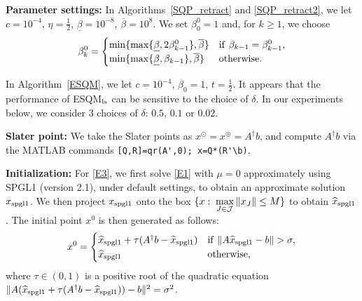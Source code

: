 \documentclass[10pt]{article}
\numberwithin{equation}{section}
\def\xfeas{x^\odot}
\def\xfeasss{x^\circledcirc}
\begin{document}
\textbf{Parameter settings:} In Algorithms~\ref{SQP_retract} and \ref{SQP_retract2}, we let $c = 10^{-4}$, $\eta = \frac{1}{2}$, $\underline{\beta} = 10^{-8}$, $\overline{\beta} = 10^8$. We set $\beta^0_0=1$ and, for $k \geq 1$, we choose
\[
\beta_k^0 = \begin{cases}
  \min\{\max\{\underline\beta,2\beta_{k-1}^0\},\overline\beta\} & {\rm if}\ \beta_{k-1} = \beta_{k-1}^0,\\
  \min\{\max\{\underline\beta,\beta_{k-1}\},\overline\beta\} & {\rm otherwise.}
\end{cases}
\]

In Algorithm~\ref{ESQM}, we let $c = 10^{-4}$, $\beta_0 = 1$, $t = \frac{1}{2}$. It appears that the performance of ESQM$_{\rm ls}$ can be sensitive to the choice of $\delta$. In our experiments below, we consider 3 choices of $\delta$: $0.5$, $0.1$ or $0.02$.

\textbf{Slater point:} We take the Slater points as $\xfeas = \xfeasss = A^\dagger b$, and compute $A^\dagger b$ via the MATLAB commands \verb+[Q,R]=qr(A',0); x=Q*(R'\b)+.

\textbf{Initialization:} For \eqref{E3}, we first solve \eqref{E1} with $\mu = 0$ approximately using SPGL1 \cite{BeFr09} (version 2.1), under default settings, to obtain an approximate solution $x_{\rm spgl1}$. We then project $x_{\rm spgl1}$ onto the box $\{x:\; \max\limits_{J\in{\cal J}}\|x_J\|\le M\}$ to obtain $\widehat x_{\rm spgl1}$. The initial point $x^0$ is then generated as follows:
\begin{equation}\label{initial1}
x^0 = \begin{cases}
  \widehat x_{\rm spgl1} + \tau(A^\dagger b - \widehat x_{\rm spgl1}) & {\rm if}\ \|A\widehat x_{\rm spgl1} - b\| > \sigma,\\
  \widehat x_{\rm spgl1} & {\rm otherwise},
\end{cases}
\end{equation}
where $\tau\in(0, 1)$ is a positive root of the quadratic equation $\|A(\widehat x_{\rm spgl1} + \tau(A^\dagger b - \widehat x_{\rm spgl1})) - b\|^2=\sigma^2$.
\end{document}
